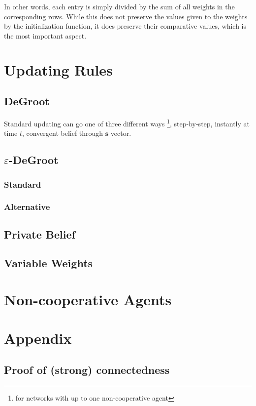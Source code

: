 \documentclass{article}
\begin{document}
In other words, each entry is simply divided by the sum of all weights in the corresponding rows. While this does not preserve the values given to the weights by the initialization function, it does preserve their comparative values, which is the most important aspect.



\section{Updating Rules}

\subsection{DeGroot}

Standard updating can go one of three different ways \footnote{for networks with up to one non-cooperative agent}, step-by-step, instantly at time $t$, convergent belief through $\textbf{s}$ vector.

\subsection{$\varepsilon$-DeGroot}
\subsubsection{Standard}
\subsubsection{Alternative}

\subsection{Private Belief}

\subsection{Variable Weights}

\section{Non-cooperative Agents}

\newpage
\section{Appendix}
\subsection{Proof of (strong) connectedness}
\end{document}
